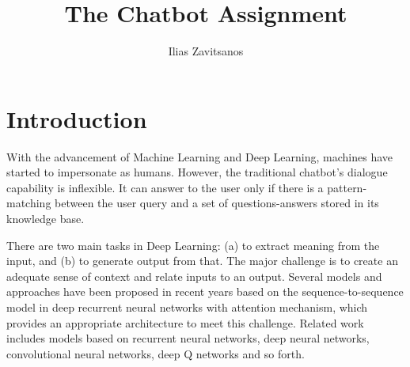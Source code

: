 \documentclass[10pt, twocolumn, a4paper]{article}
\begin{document}
\title{The Chatbot Assignment}
\author{Ilias Zavitsanos}
 
\maketitle 


\section{Introduction}
With the advancement of Machine Learning and Deep Learning, machines have started to impersonate as humans. However, the traditional chatbot’s dialogue capability is inflexible. It can answer to the user only if there is a pattern-matching between the user query and a set of questions-answers stored in its knowledge base. %

There are two main tasks in Deep Learning: (a) to extract meaning from the input, and (b) to generate output from that. The major challenge is to create an adequate sense of context and relate inputs to an output. Several models and approaches have been proposed in recent years based on the sequence-to-sequence model in deep recurrent neural networks with attention mechanism, which provides an appropriate architecture to meet this challenge. Related work includes models based on recurrent neural networks, deep neural networks, convolutional neural networks, deep Q networks and so forth.
\end{document}
